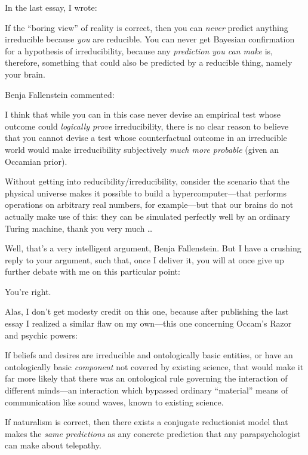 
{
 In the last essay, I wrote:}

{
 If the ``boring view'' of
reality is correct, then you can \textit{never} predict anything
irreducible because \textit{you} are reducible. You can never get
Bayesian confirmation for a hypothesis of irreducibility, because any
\textit{prediction you can make} is, therefore, something that could
also be predicted by a reducible thing, namely your brain.}

{
 Benja Fallenstein commented:}

{
 I think that while you can in this case never devise an empirical
test whose outcome could \textit{logically prove} irreducibility, there
is no clear reason to believe that you cannot devise a test whose
counterfactual outcome in an irreducible world would make
irreducibility subjectively \textit{much more probable} (given an
Occamian prior).}

{
 Without getting into reducibility/irreducibility, consider the
scenario that the physical universe makes it possible to build a
hypercomputer---that performs operations on arbitrary real numbers, for
example---but that our brains do not actually make use of this: they
can be simulated perfectly well by an ordinary Turing machine, thank
you very much \ldots}

{
 Well, that's a very intelligent argument, Benja
Fallenstein. But I have a crushing reply to your argument, such that,
once I deliver it, you will at once give up further debate with me on
this particular point:}

{
 You're right.}

{
 Alas, I don't get modesty credit on this one,
because after publishing the last essay I realized a similar flaw on my
own---this one concerning Occam's Razor and psychic
powers:}

{
 If beliefs and desires are irreducible and ontologically basic
entities, or have an ontologically basic \textit{component} not covered
by existing science, that would make it far more likely that there was
an ontological rule governing the interaction of different minds---an
interaction which bypassed ordinary
``material'' means of communication
like sound waves, known to existing science.}

{
 If naturalism is correct, then there exists a conjugate
reductionist model that makes the \textit{same predictions} as any
concrete prediction that any parapsychologist can make about
telepathy.}

